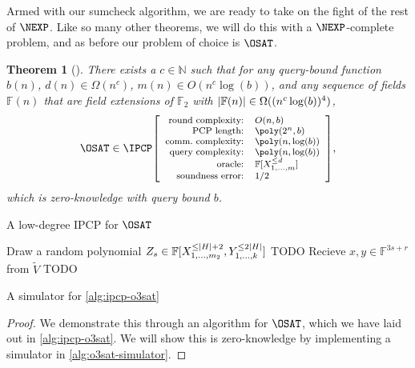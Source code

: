 \documentclass[english,12pt]{reedthesis}
\theoremstyle{plain}
\newtheorem{thm}{Theorem}[section]
\theoremstyle{definition}
\theoremstyle{remark}
\DeclarePairedDelimiter{\abs}{\lvert}{\rvert}
\newcommand{\ldipcp}[6]{%
  \ensuremath%
  \mleft[{\footnotesize\begin{array}{r l}
    \text{round complexity:} & #1 \\
    \text{PCP length:} & #2 \\
    \text{comm.\ complexity:} & #3 \\
    \text{query complexity:} & #4 \\
    \text{oracle:} & #5 \\
    \text{soundness error:} & #6
  \end{array}}\mright]%
}
\begin{document}

Armed with our sumcheck algorithm, we are ready to take on the fight of the rest
of $\NEXP$. Like so many other theorems, we will do this with a $\NEXP$-complete
problem, and as before our problem of choice is $\OSAT$.

\begin{thm}[{\cite[Thm.\ 14.2]{CFGS22}}]\label{thm:pzkipcp-for-nexp}
  There exists a $c \in \mathbb{N}$ such that for any query-bound function $b(n)$,
  $d(n) \in \Omega(n^{c})$, $m(n) \in O(n^{c}\log(b))$, and any sequence of fields
  $\mathbb{F}(n)$ that are field extensions of $\mathbb{F}_{2}$ with
  $\abs{\mathbb{F}(n)} \in \Omega((n^{c}\log(b))^{4})$,
  \begin{equation*}
    \OSAT \in \IPCP\ldipcp{O(n, b)}{\poly(2^{n}, b)}{\poly(n, \log(b))}{\poly(n, \log(b))}{\mathbb{F}[X_{1, \ldots, m}^{\le d}]}{1/2},
  \end{equation*}
  which is zero-knowledge with query bound $b$.
\end{thm}

\begin{algorithm}[htbp]
  \caption{A low-degree IPCP for $\OSAT$~\cite[p.\ 15:36]{CFGS22}}\label{alg:ipcp-o3sat}
\end{algorithm}

\begin{algorithm}[htbp]
  Draw a random polynomial
  $Z_{s} \in \mathbb{F}[X_{1, \ldots, m_{2}}^{\le \abs{H}+2}, Y_{1, \ldots, k}^{\le 2\abs{H}}]$\;
  TODO\; %
  Recieve $x, y \in \mathbb{F}^{3s + r}$ from $\tilde{V}$\;
  TODO\; %
  \caption{A simulator for \cref{alg:ipcp-o3sat}~\cite[p.\ 15.37]{CFGS22}}\label{alg:o3sat-simulator}
\end{algorithm}

\begin{proof}
  We demonstrate this through an algorithm for $\OSAT$, which we have laid out
  in \cref{alg:ipcp-o3sat}. We will show this is zero-knowledge by implementing
  a simulator in \cref{alg:o3sat-simulator}.
\end{proof}
\end{document}
